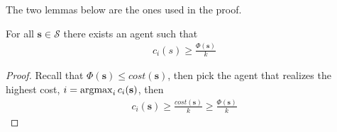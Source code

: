 The two lemmas below are the ones used in the proof.

\begin{lemma}
For all $\mathbf{s}\in\mathcal{S}$ there exists an agent such that
\begin{align*}
c_i(s)\geq \frac{\Phi(\mathbf{s})}{k}
\end{align*}
\begin{proof}
Recall that $\Phi(\mathbf{s})\leq cost(\mathbf{s})$, then pick the agent that realizes the highest cost, $i=\operatorname*{argmax}_{i}c_i(\mathbf{s})$, then
\begin{align*}
c_i(\mathbf{s})\geq \frac{cost(\mathbf{s})}{k}\geq \frac{\Phi(\mathbf{s})}{k}
\end{align*}

\end{proof}
\label{lemma:highcostagent}
\end{lemma}

